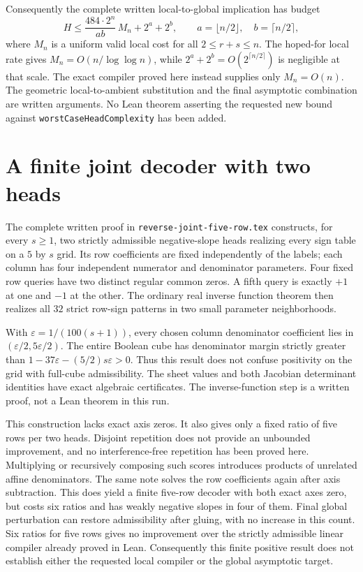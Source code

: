 \documentclass[11pt]{article}
\begin{document}
Consequently the complete written local-to-global implication has budget
\[
 H\leq \frac{484\cdot2^n}{ab}\,M_n+2^a+2^b,
 \qquad a=\lfloor n/2\rfloor,\quad b=\lceil n/2\rceil,
\]
where $M_n$ is a uniform valid local cost for all $2\leq r+s\leq n$.
The hoped-for local rate gives $M_n=O(n/\log\log n)$, while
$2^a+2^b=O(2^{\lceil n/2\rceil})$ is negligible at that scale.
The exact compiler proved here instead supplies only $M_n=O(n)$.
The geometric local-to-ambient substitution and the final asymptotic
combination are written arguments. No Lean theorem asserting the requested
new bound against \texttt{worstCaseHeadComplexity} has been added.

\section{A finite joint decoder with two heads}
The complete written proof in \texttt{reverse-joint-five-row.tex}
constructs, for every $s\geq1$, two strictly admissible negative-slope
heads realizing every sign table on a $5$ by $s$ grid.
Its row coefficients are fixed independently of the labels; each column
has four independent numerator and denominator parameters.
Four fixed row queries have two distinct regular common zeros. A fifth
query is exactly $+1$ at one and $-1$ at the other. The ordinary real
inverse function theorem then realizes all $32$ strict row-sign patterns
in two small parameter neighborhoods.

With $\varepsilon=1/(100(s+1))$, every chosen column denominator
coefficient lies in $(\varepsilon/2,5\varepsilon/2)$. The entire Boolean
cube has denominator margin strictly greater than
$1-37\varepsilon-(5/2)s\varepsilon>0$. Thus this result does not
confuse positivity on the grid with full-cube admissibility.
The sheet values and both Jacobian determinant identities have exact
algebraic certificates. The inverse-function step is a written proof,
not a Lean theorem in this run.

This construction lacks exact axis zeros. It also gives only a fixed
ratio of five rows per two heads. Disjoint repetition does not provide
an unbounded improvement, and no interference-free repetition has been
proved here. Multiplying or recursively composing such scores introduces
products of unrelated affine denominators. The same note solves the row
coefficients again after axis subtraction. This does yield a finite
five-row decoder with both exact axes zero, but costs six ratios and
has weakly negative slopes in four of them. Final global perturbation
can restore admissibility after gluing, with no increase in this count.
Six ratios for five rows gives no improvement over the strictly admissible
linear compiler already proved in Lean.
Consequently this finite positive result does not establish either the
requested local compiler or the global asymptotic target.
\end{document}
